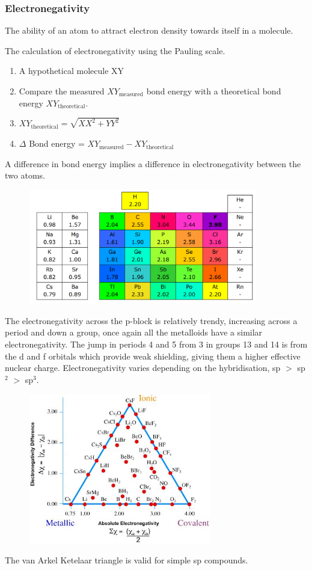 \documentclass{article}
\begin{document}
    \subsubsection{Electronegativity} The ability of an atom to attract electron density towards itself in a molecule.
    
    The calculation of electronegativity using the Pauling scale.
    \begin{enumerate}
        \item A hypothetical molecule XY
        \item Compare the measured \(XY_{\text{measured}}\) bond energy with a theoretical bond energy \(XY_{\text{theoretical}}.\)
        \item \(XY_{\text{theoretical}} = \sqrt{XX^2 + YY^2}\)
        \item \(\Delta\) Bond energy = \(XY_{\text{measured}} - XY_{\text{theoretical}}\)
    \end{enumerate}

    A difference in bond energy implies a difference in electronegativity between the two atoms.
    \begin{figure}[h]
        \centering
        \includegraphics[width=10cm]{pauling.png}
    \end{figure}

    The electronegativity across the p-block is relatively trendy, increasing across a period and down a group,
    once again all the metalloids have a similar electronegativity. The jump in periods 4 and 5 from 3 in groups
    13 and 14 is from the d and f orbitals which provide weak shielding, giving them a higher effective nuclear 
    charge. Electronegativity varies depending on the hybridisation, sp \(>\) sp \(^2\) \(>\) sp\(^3\).
    \begin{figure}[h]
        \centering
        \includegraphics[width=8cm]{triangle.jpg}
    \end{figure}
    The van Arkel Ketelaar triangle is valid for simple sp compounds. 
\end{document}
